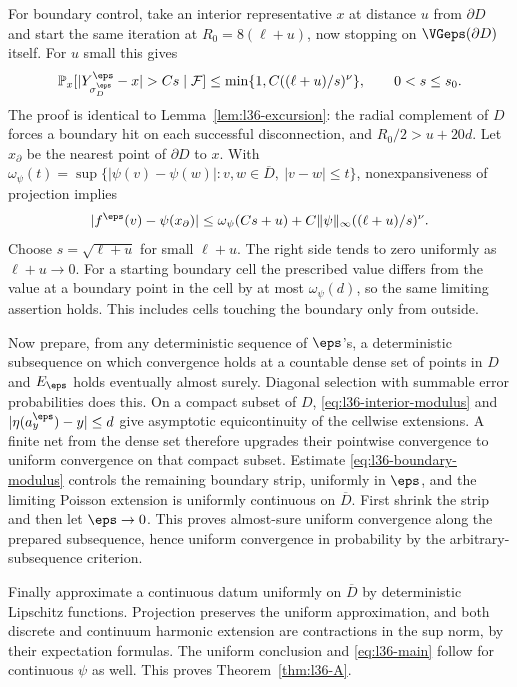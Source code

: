 For boundary control, take an interior representative $x$
at distance $u$ from $\partial D$ and start the same iteration
at $R_0=8(\ell+u)$, now stopping on $\VGeps(\partial D)$ itself.
For $u$ small this gives
\[
 \mathbb{P}_x[|Y^\eps_{\sigma_D^\eps}-x|>Cs\mid\mathcal F]
 \le \min\{1,C((\ell+u)/s)^\nu\},\qquad 0<s\le s_0.
\]
The proof is identical to Lemma~\ref{lem:l36-excursion}:
the radial complement of $D$ forces a boundary hit on each
successful disconnection, and $R_0/2>u+20d$.
Let $x_\partial$ be the nearest point of $\partial D$ to $x$.
With
$\omega_\psi(t)=\sup\{|\psi(v)-\psi(w)|:
v,w\in\overline D,\ |v-w|\le t\}$,
nonexpansiveness of projection implies
\begin{equation}\label{eq:l36-boundary-modulus}
 |f^\eps(v)-\psi(x_\partial)|
 \le \omega_\psi(Cs+u)
       +C\|\psi\|_\infty((\ell+u)/s)^\nu .
\end{equation}
Choose $s=\sqrt{\ell+u}$ for small $\ell+u$.
The right side tends to zero uniformly as $\ell+u\to0$.
For a starting boundary cell the prescribed value differs
from the value at a boundary point in the cell by at most
$\omega_\psi(d)$, so the same limiting assertion holds.
This includes cells touching the boundary only from outside.

Now prepare, from any deterministic sequence of $\eps$'s,
a deterministic subsequence on which convergence holds at a
countable dense set of points in $D$ and $E_\eps$ holds
eventually almost surely. Diagonal selection with summable
error probabilities does this.
On a compact subset of $D$, \eqref{eq:l36-interior-modulus} and
$|\eta(a_y^\eps)-y|\le d$ give asymptotic equicontinuity of
the cellwise extensions. A finite net from the dense set
therefore upgrades their pointwise convergence to uniform
convergence on that compact subset.
Estimate \eqref{eq:l36-boundary-modulus} controls the remaining
boundary strip, uniformly in $\eps$, and the limiting
Poisson extension is uniformly continuous on $\overline D$.
First shrink the strip and then let $\eps\to0$.
This proves almost-sure uniform convergence along the
prepared subsequence, hence uniform convergence in probability
by the arbitrary-subsequence criterion.

Finally approximate a continuous datum uniformly on
$\overline D$ by deterministic Lipschitz functions. Projection
preserves the uniform approximation, and both discrete and
continuum harmonic extension are contractions in the sup norm,
by their expectation formulas. The uniform conclusion and
\eqref{eq:l36-main} follow for continuous $\psi$ as well.
This proves Theorem~\ref{thm:l36-A}.

